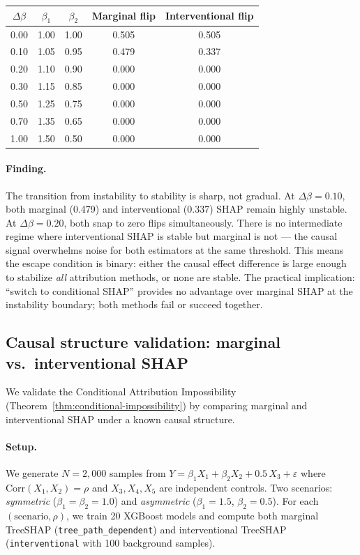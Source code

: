 \documentclass{article}
\begin{document}
\begin{center}
\small
\begin{tabular}{@{}ccccc@{}}
\toprule
$\Delta\beta$ & $\beta_1$ & $\beta_2$ & Marginal flip & Interventional flip \\
\midrule
0.00 & 1.00 & 1.00 & 0.505 & 0.505 \\
0.10 & 1.05 & 0.95 & 0.479 & 0.337 \\
0.20 & 1.10 & 0.90 & 0.000 & 0.000 \\
0.30 & 1.15 & 0.85 & 0.000 & 0.000 \\
0.50 & 1.25 & 0.75 & 0.000 & 0.000 \\
0.70 & 1.35 & 0.65 & 0.000 & 0.000 \\
1.00 & 1.50 & 0.50 & 0.000 & 0.000 \\
\bottomrule
\end{tabular}
\end{center}

\paragraph{Finding.}
The transition from instability to stability is sharp, not gradual.
At $\Delta\beta = 0.10$, both marginal (0.479) and interventional
(0.337) SHAP remain highly unstable. At $\Delta\beta = 0.20$,
both snap to zero flips simultaneously. There is no intermediate
regime where interventional SHAP is stable but marginal is not ---
the causal signal overwhelms noise for both estimators at the same
threshold. This means the escape condition is binary: either the
causal effect difference is large enough to stabilize \emph{all}
attribution methods, or none are stable. The practical implication:
``switch to conditional SHAP'' provides no advantage over marginal
SHAP at the instability boundary; both methods fail or succeed
together.

\subsection{Causal structure validation: marginal vs.\ interventional SHAP}

We validate the Conditional Attribution Impossibility
(Theorem~\ref{thm:conditional-impossibility}) by comparing marginal and
interventional SHAP under a known causal structure.

\paragraph{Setup.}
We generate $N{=}2{,}000$ samples from
$Y = \beta_1 X_1 + \beta_2 X_2 + 0.5\,X_3 + \varepsilon$ where
$\text{Corr}(X_1, X_2) = \rho$ and $X_3, X_4, X_5$ are independent
controls. Two scenarios: \emph{symmetric} ($\beta_1 = \beta_2 = 1.0$)
and \emph{asymmetric} ($\beta_1 = 1.5$, $\beta_2 = 0.5$).
For each $(\text{scenario}, \rho)$, we train 20 XGBoost models and compute
both marginal TreeSHAP (\texttt{tree\_path\_dependent}) and interventional
TreeSHAP (\texttt{interventional} with 100 background samples).
\end{document}
